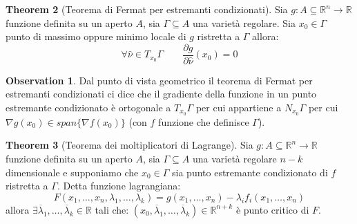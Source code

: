 \documentclass[leqno]{article}
\theoremstyle{definition}
\numberwithin{equation}{section}
\newtheorem{theorem}{Theorem}[section]
\newtheorem{observation}[theorem]{Observation}
\theoremstyle{remark}
\begin{document}
	\begin{theorem}[Teorema di Fermat per estremanti condizionati]
		Sia $g:A\subseteq \mathbb{R}^n \rightarrow \mathbb{R}$ funzione definita su un aperto $A$, sia $\Gamma \subseteq A$ una varietà regolare. Sia $x_0 \in \Gamma$ punto di massimo oppure minimo locale di $g$ ristretta a $\Gamma$ allora: 
		\begin{equation}
			\forall \hat{\nu}\in T_{x_0}\Gamma \quad \quad \dfrac{\partial g}{\partial \hat{\nu}}(x_0)=0
		\end{equation}
		\begin{observation}
			Dal punto di vista geometrico il teorema di Fermat per estremanti condizionati ci dice che il gradiente della funzione in un punto estremante condizionato è ortogonale a $T_{x_0}\Gamma$ per cui appartiene a $N_{x_0}\Gamma$ per cui $\nabla g(x_0)\in span \{ \nabla f(x_0) \}$ (con $f$ funzione che definisce $\Gamma$).
		\end{observation}
	\end{theorem}
	\begin{theorem}[Teorema dei moltiplicatori di Lagrange]
		Sia $g:A\subseteq \mathbb{R}^n \rightarrow \mathbb{R}$ funzione definita su un aperto $A$, sia $\Gamma \subseteq A$ una varietà regolare $n-k$ dimensionale e supponiamo che $x_0\in \Gamma$ sia punto estremante condizionato di $f$ ristretta a $\Gamma$. Detta funzione lagrangiana:
		\begin{equation}
			F(x_1,\dots,x_n,\lambda_1,\dots,\lambda_k)=g(x_1,\dots,x_n)-\lambda_i f_i(x_1,\dots,x_n)
		\end{equation}
		allora $\exists\overline{\lambda}_1,\dots,\overline{\lambda}_k \in \mathbb{R}$ tali che: $(x_0,\overline{\lambda}_1,\dots,\overline{\lambda}_k) \in \mathbb{R}^{n+k}$ è punto critico di $F$.
	\end{theorem}
\end{document}
